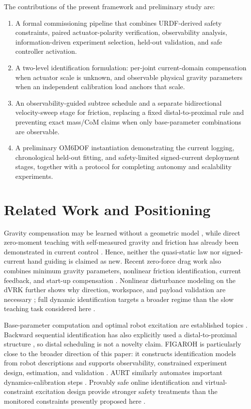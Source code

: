 \documentclass[conference]{IEEEtran}
\begin{document}
The contributions of the present framework and preliminary study are:
\begin{enumerate}
  \item A formal commissioning pipeline that combines URDF-derived safety
  constraints, paired actuator-polarity verification, observability analysis,
  information-driven experiment selection, held-out validation, and safe
  controller activation.
  \item A two-level identification formulation: per-joint current-domain
  compensation when actuator scale is unknown, and observable physical gravity
  parameters when an independent calibration load anchors that scale.
  \item An observability-guided subtree schedule and a separate bidirectional
  velocity-sweep stage for friction, replacing a fixed distal-to-proximal rule
  and preventing exact mass/CoM claims when only base-parameter combinations
  are observable.
  \item A preliminary OM6DOF instantiation demonstrating the current logging,
  chronological held-out fitting, and safety-limited signed-current deployment
  stages, together with a protocol for completing autonomy and scalability
  experiments.
\end{enumerate}

\section{Related Work and Positioning}
Gravity compensation may be learned without a geometric model \cite{Yu2018},
while direct zero-moment teaching with self-measured gravity and friction has
already been demonstrated in current control \cite{Chen2018,Chen2023}. Hence,
neither the quasi-static law nor signed-current hand guiding is claimed as new.
Recent zero-force drag work also combines minimum gravity parameters, nonlinear
friction identification, current feedback, and start-up compensation
\cite{Li2025ZeroForce}.
Nonlinear disturbance modeling on the dVRK further shows why direction,
workspace, and payload validation are necessary \cite{Lin2019}; full dynamic
identification targets a broader regime than the slow teaching task considered
here \cite{Zhou2026}.

Base-parameter computation and optimal robot excitation are established topics
\cite{Gautier1991Base,Swevers1997Optimal}. Backward sequential identification
has also explicitly used a distal-to-proximal structure \cite{Jung2018Backward},
so distal scheduling is not a novelty claim. FIGAROH is particularly close to
the broader direction of this paper: it constructs identification models from
robot descriptions and supports observability, constrained experiment design,
estimation, and validation \cite{Nguyen2023FIGAROH}. AURT similarly automates
important dynamics-calibration steps \cite{Madsen2022AURT}. Provably safe
online identification and virtual-constraint excitation design provide stronger
safety treatments than the monitored constraints presently proposed here
\cite{Tian2024VirtualConstraints,Zhang2025SafeSysID}.
\end{document}

